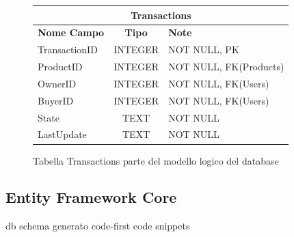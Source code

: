 \begin{figure}[ht]
    \centering\begin{tabular}{ |l|c|l| } 
    \hline
    \multicolumn{3}{|c|}{\large\textbf{Transactions}} \\
    \hline
    \textbf{Nome Campo} & \textbf{Tipo} & \textbf{Note} \\
    \hline
    TransactionID & INTEGER & NOT NULL, PK \\
    ProductID & INTEGER & NOT NULL, FK(Products) \\
    OwnerID & INTEGER & NOT NULL, FK(Users) \\
    BuyerID & INTEGER & NOT NULL, FK(Users) \\
    State & TEXT & NOT NULL \\
    LastUpdate & TEXT & NOT NULL \\
    \hline
    \end{tabular}
    \caption{Tabella Transactions parte del modello logico del database}
\end{figure}
\subsection{Entity Framework Core}
db schema generato code-first
code snippets